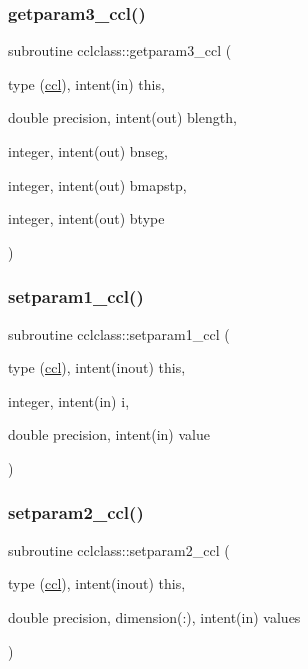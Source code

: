 \mbox{\label{namespacecclclass_ad223096667fbe2e53bae56b52b2350fa}} 
\subsubsection{\texorpdfstring{getparam3\_ccl()}{getparam3\_ccl()}}
{\footnotesize\ttfamily subroutine cclclass\+::getparam3\+\_\+ccl (\begin{DoxyParamCaption}\item[{type (\mbox{\hyperlink{namespacecclclass_structcclclass_1_1ccl}{ccl}}), intent(in)}]{this,  }\item[{double precision, intent(out)}]{blength,  }\item[{integer, intent(out)}]{bnseg,  }\item[{integer, intent(out)}]{bmapstp,  }\item[{integer, intent(out)}]{btype }\end{DoxyParamCaption})}

\mbox{\label{namespacecclclass_adf1829da601e1090ce5f5e5046c4d62c}} 
\subsubsection{\texorpdfstring{setparam1\_ccl()}{setparam1\_ccl()}}
{\footnotesize\ttfamily subroutine cclclass\+::setparam1\+\_\+ccl (\begin{DoxyParamCaption}\item[{type (\mbox{\hyperlink{namespacecclclass_structcclclass_1_1ccl}{ccl}}), intent(inout)}]{this,  }\item[{integer, intent(in)}]{i,  }\item[{double precision, intent(in)}]{value }\end{DoxyParamCaption})}

\mbox{\label{namespacecclclass_a7bc5a807438db526489d8773fa168375}} 
\subsubsection{\texorpdfstring{setparam2\_ccl()}{setparam2\_ccl()}}
{\footnotesize\ttfamily subroutine cclclass\+::setparam2\+\_\+ccl (\begin{DoxyParamCaption}\item[{type (\mbox{\hyperlink{namespacecclclass_structcclclass_1_1ccl}{ccl}}), intent(inout)}]{this,  }\item[{double precision, dimension(\+:), intent(in)}]{values }\end{DoxyParamCaption})}


